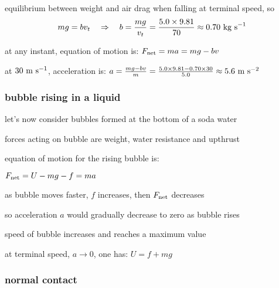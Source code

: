 \sol equilibrium between weight and air drag when falling at terminal speed, so
\begin{equation*}
	mg = bv_t \quad \Rightarrow \quad b = \frac{mg}{v_t} = \frac{5.0\times9.81}{70} \approx 0.70 \text{ kg s}^{-1}
\end{equation*}

at any instant, equation of motion is: $F_\text{net} = ma = mg - bv$

at $30\text{ m s$^{-1}$}$, acceleration is: $a = \frac{mg-bv}{m} = \frac{5.0\times9.81-0.70\times30}{5.0} \approx 5.6 \text{ m s$^{-2}$}$ \eoe

\subsubsection*{bubble rising in a liquid}

\begin{wrapfigure}{r}{0.15\textwidth}
	\vspace*{-16pt}
	\centering
	\vspace*{-16pt}
\end{wrapfigure}

let's now consider bubbles formed at the bottom of a soda water

forces acting on bubble are weight, water resistance and upthrust

equation of motion for the rising bubble is:

{
	\centering
	
	$ F_\text{net} = U - mg - f = ma $
	
}

as bubble moves faster, $f$ increases, then $F_\text{net}$ decreases

so acceleration $a$ would gradually decrease to zero as bubble rises

speed of bubble increases and reaches a maximum value

at terminal speed, $a\to0$, one has: $U=f+mg$



\subsubsection{normal contact}

